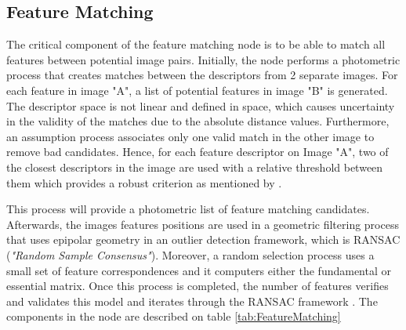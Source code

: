 \documentclass[12pt]{report}
\begin{document}
      \subsection{Feature Matching}
      The critical component of the feature matching node is to be able to match all features between potential image pairs.
      Initially, the node performs a photometric process that creates matches between the descriptors from 2 separate images. For each feature in image "A", a list of potential features in image "B" is generated.
      The descriptor space is not linear and defined in space, which causes uncertainty in the validity of the matches due to the absolute distance values. 
      Furthermore, an assumption process associates only one valid match in the other image to remove bad candidates.
      Hence, for each feature descriptor on Image "A", two of the closest descriptors in the image are used with a relative threshold between them which provides a robust criterion as mentioned by .
      
      This process will provide a photometric list of feature matching candidates. Afterwards, the images features positions are used in a geometric
      filtering process that uses epipolar geometry in an outlier detection framework, which is RANSAC (\textit{"Random Sample Consensus"}).
      Moreover, a random selection process uses a small set of feature correspondences and it computers either the fundamental or essential matrix. 
      Once this process is completed, the number of features verifies and validates this model and iterates through the RANSAC framework .
      \enlargethispage{\baselineskip}
      The components in the node are described on table \ref{tab:FeatureMatching}
      
\end{document}
